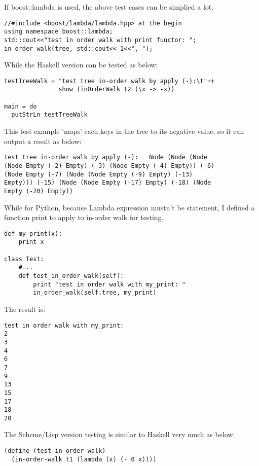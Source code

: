 \documentclass{article}
\begin{document}
If boost::lambda is used, the above test cases can be simplied
a lot.
\begin{lstlisting}
//#include <boost/lambda/lambda.hpp> at the begin
using namespace boost::lambda;
std::cout<<"test in order walk with print functor: ";
in_order_walk(tree, std::cout<<_1<<", ");
\end{lstlisting}

While the Haskell version can be tested as below:

\lstset{language=Haskell}
\begin{lstlisting}
testTreeWalk = "test tree in-order walk by apply (-):\t"++
               show (inOrderWalk t2 (\x -> -x))

main = do
  putStrLn testTreeWalk
\end{lstlisting}

This test example 'maps' each keys in the tree to its negative value,
so it can output a result as below:

\begin{verbatim}
test tree in-order walk by apply (-):   Node (Node (Node 
(Node Empty (-2) Empty) (-3) (Node Empty (-4) Empty)) (-6) 
(Node Empty (-7) (Node (Node Empty (-9) Empty) (-13) 
Empty))) (-15) (Node (Node Empty (-17) Empty) (-18) (Node 
Empty (-20) Empty))
\end{verbatim}

While for Python, because Lambda expression mustn't be statement,
I defined a function print to apply to in-order walk for testing.

\lstset{language=Python}
\begin{lstlisting}
def my_print(x):
    print x

class Test:
    #...
    def test_in_order_walk(self):
        print "test in order walk with my_print: "
        in_order_walk(self.tree, my_print)
\end{lstlisting}

The result is:

\begin{verbatim}
test in order walk with my_print:
2
3
4
6
7
9
13
15
17
18
20
\end{verbatim}

The Scheme/Lisp version testing is similar to Haskell very much as below.

\lstset{language=lisp}
\begin{lstlisting}
(define (test-in-order-walk)
  (in-order-walk t1 (lambda (x) (- 0 x))))
\end{lstlisting}
\end{document}
